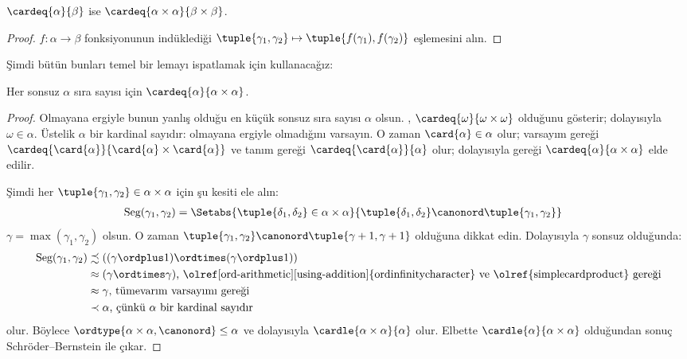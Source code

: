 \documentclass[../../../include/open-logic-section]{subfiles}
\begin{document}
\begin{prop}
$\cardeq{\alpha}{\beta}$ ise
$\cardeq{\alpha \times \alpha}{\beta \times \beta}$.
\end{prop}

\begin{proof}
$f\colon\alpha\to\beta$ fonksiyonunun indüklediği
$\tuple{\gamma_1,\gamma_2}\mapsto
\tuple{f(\gamma_1),f(\gamma_2)}$ eşlemesini alın.
\end{proof}
\noindent
Şimdi bütün bunları temel bir lemayı ispatlamak için kullanacağız:
\begin{lem}
Her sonsuz $\alpha$ sıra sayısı için
$\cardeq{\alpha}{\alpha\times\alpha}$.
\end{lem}

\begin{proof}
Olmayana ergiyle bunun yanlış olduğu en küçük sonsuz sıra sayısı $\alpha$
olsun. ,
$\cardeq{\omega}{\omega\times\omega}$ olduğunu gösterir; dolayısıyla
$\omega\in\alpha$. Üstelik $\alpha$ bir kardinal sayıdır: olmayana
ergiyle olmadığını varsayın. O zaman $\card{\alpha}\in\alpha$ olur;
varsayım gereği
$\cardeq{\card{\alpha}}{\card{\alpha}\times\card{\alpha}}$ ve tanım
gereği $\cardeq{\card{\alpha}}{\alpha}$ olur; dolayısıyla
 gereği
$\cardeq{\alpha}{\alpha\times\alpha}$ elde edilir.

Şimdi her $\tuple{\gamma_1,\gamma_2}\in\alpha\times\alpha$ için şu
kesiti ele alın:
\begin{align*}
	\text{Seg}(\gamma_1, \gamma_2) &= \Setabs{\tuple{\delta_1, \delta_2} \in \alpha \times \alpha}{\tuple{\delta_1, \delta_2} \canonord \tuple{\gamma_1, \gamma_2}}
\end{align*}
$\gamma=\max(\gamma_1,\gamma_2)$ olsun. O zaman
$\tuple{\gamma_1,\gamma_2}\canonord
\tuple{\gamma+1,\gamma+1}$ olduğuna dikkat edin. Dolayısıyla $\gamma$
sonsuz olduğunda:
\begin{align*}
	\text{Seg}(\gamma_1, \gamma_2) &
	\precsim ((\gamma \ordplus 1)\ordtimes (\gamma \ordplus 1))\\
	&\approx (\gamma \ordtimes \gamma)
	\text{, \olref[ord-arithmetic][using-addition]{ordinfinitycharacter} ve
	\olref{simplecardproduct} gereği}\\
	&\approx \gamma \text{, tümevarım varsayımı gereği}\\
	& \prec \alpha\text{, çünkü $\alpha$ bir kardinal sayıdır}
\end{align*}
olur. Böylece $\ordtype{\alpha\times\alpha,\canonord}\leq\alpha$ ve
dolayısıyla $\cardle{\alpha\times\alpha}{\alpha}$ olur. Elbette
$\cardle{\alpha}{\alpha\times\alpha}$ olduğundan sonuç
Schröder--Bernstein ile çıkar.
\end{proof}
\end{document}

